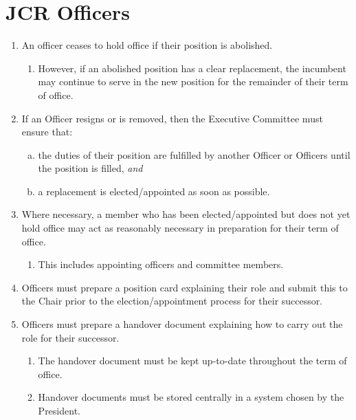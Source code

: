 \documentclass[12pt]{article}
\begin{document}
\section{JCR Officers}
\begin{enumerate}
    \item An officer ceases to hold office if their position is abolished.
    \begin{enumerate}
            \item However, if an abolished position has a clear replacement, the incumbent may continue to serve in the new position for the remainder of their term of office.
    \end{enumerate}
    \item If an Officer resigns or is removed, then the Executive Committee must ensure that:
    \begin{enumerate}[(a)]
        \item the duties of their position are fulfilled by another Officer or Officers until the position is filled, \emph{and}
        \item a replacement is elected/appointed as soon as possible.
    \end{enumerate}
    \item\label{preterm-prep} Where necessary, a member who has been elected/appointed but does not yet hold office may act as reasonably necessary in preparation for their term of office.
    \begin{enumerate}
        \item This includes appointing officers and committee members.
    \end{enumerate}
    \item Officers must prepare a position card explaining their role and submit this to the Chair prior to the election/appointment process for their successor.
    \item Officers must prepare a handover document explaining how to carry out the role for their successor.
    \begin{enumerate}
        \item The handover document must be kept up-to-date throughout the term of office.
        \item Handover documents must be stored centrally in a system chosen by the President.
    \end{enumerate}
\end{enumerate}
\newpage
\end{document}
